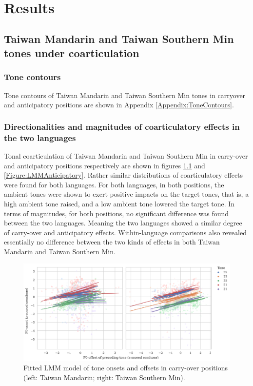 
\chapter{Results}
\section{Taiwan Mandarin and Taiwan Southern Min tones under coarticulation}

\subsection{Tone contours}

Tone contours of Taiwan Mandarin and Taiwan Southern Min tones in carryover and anticipatory positions are shown in Appendix \ref{Appendix:ToneContours}.

\subsection{Directionalities and magnitudes of coarticulatory effects in the two languages}

Tonal coarticulation of Taiwan Mandarin and Taiwan Southern Min in carry-over and anticipatory positions respectively are shown in figures \ref{Figure:LMMCarryover} and \ref{Figure:LMMAnticipatory}. Rather similar distributions of coarticulatory effects were found for both languages. For both languages, in both positions, the ambient tones were shown to exert positive impacts on the target tones, that is, a high ambient tone raised, and a low ambient tone lowered the target tone. In terms of magnitudes, for both positions, no significant difference was found between the two languages. Meaning the two languages showed a similar degree of carry-over and anticipatory effects. Within-language comparisons also revealed essentially no difference between the two kinds of effects in both Taiwan Mandarin and Taiwan Southern Min.

\begin{figure}[hbt!]
\centering
\includegraphics[width=\textwidth, trim={0 .5cm 0 0}]{figures/E1/Carryover_lang_seperated.png}
\caption{Fitted LMM model of tone onsets and offsets in carry-over positions (left: Taiwan Mandarin; right: Taiwan Southern Min).}
\label{Figure:LMMCarryover}
\end{figure}

